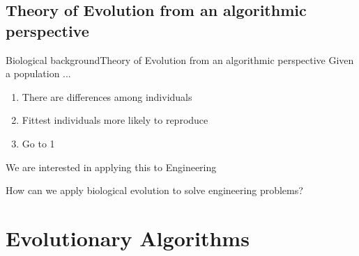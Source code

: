 \documentclass[10pt,compress]{beamer} %
\begin{document}
\subsection{{Theory of Evolution from an algorithmic perspective}}
\begin{frame}{Biological background}{Theory of Evolution from an algorithmic perspective}
	Given a population ...
	\begin{enumerate}
	\item There are differences among individuals
	\item Fittest individuals more likely to reproduce
	\item Go to 1
	\end{enumerate}
	We are interested in applying this to Engineering
\end{frame}

\begin{frame}[plain]{}
	\vspace{2cm}
	\begin{center}
	How can we apply biological evolution to solve engineering problems?
	\end{center}
\end{frame}

\section{Evolutionary Algorithms}
\end{document}
